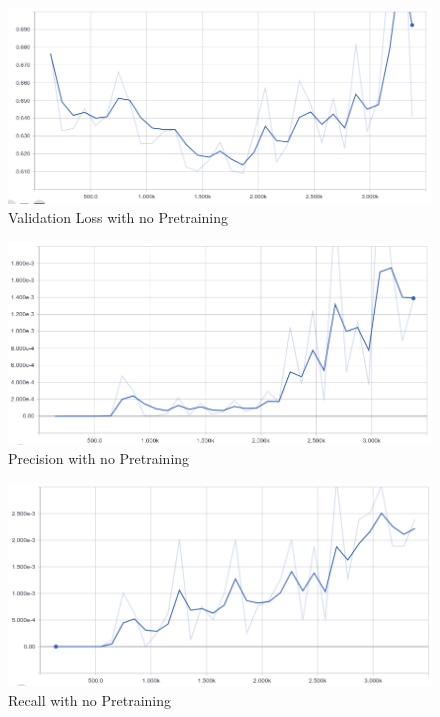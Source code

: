 \documentclass[12pt]{report}
\begin{document}
\vspace{0.5cm}
\begin{figure}[ht!]
	\centering
	\includegraphics[width=15cm]{no-ckpt-val-loss}
	\caption{Validation Loss with no Pretraining}
	\label{fig:no-ckpt-val-loss}
\end{figure}

\vspace{0.5cm}
\begin{figure}[ht!]
	\centering
	\includegraphics[width=15cm]{no-ckpt-precision}
	\caption{Precision with no Pretraining}
	\label{fig:no-ckpt-precision}
\end{figure}

\vspace{0.5cm}
\begin{figure}[ht!]
	\centering
	\includegraphics[width=15cm]{no-ckpt-recall}
	\caption{Recall with no Pretraining}
	\label{fig:no-ckpt-recall}
\end{figure}
\end{document}
